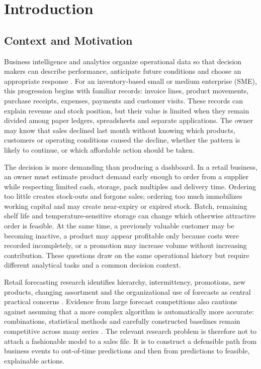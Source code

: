 \chapter{Introduction}
\label{chapter_introduction}

\section{Context and Motivation}

Business intelligence and analytics organize operational data so that decision
makers can describe performance, anticipate future conditions and choose an
appropriate response \cite{chen2012business}. For an inventory-based small or
medium enterprise (SME), this progression begins with familiar records: invoice
lines, product movements, purchase receipts, expenses, payments and customer
visits. These records can explain revenue and stock position, but their value is
limited when they remain divided among paper ledgers, spreadsheets and separate
applications. The owner may know that sales declined last month without knowing
which products, customers or operating conditions caused the decline, whether
the pattern is likely to continue, or which affordable action should be taken.

The decision is more demanding than producing a dashboard. In a retail
business, an owner must estimate product demand early enough to order from a
supplier while respecting limited cash, storage, pack multiples and delivery
time. Ordering too little creates stock-outs and forgone sales; ordering too
much immobilizes working capital and may create near-expiry or expired stock.
Batch, remaining shelf life and temperature-sensitive storage can change which
otherwise attractive order is feasible. At the same time, a previously valuable
customer may be becoming inactive, a product may appear profitable only because
costs were recorded incompletely, or a promotion may increase volume without
increasing contribution. These questions draw on the same operational history
but require different analytical tasks and a common decision context.

Retail forecasting research identifies hierarchy, intermittency, promotions,
new products, changing assortment and the organizational use of forecasts as
central practical concerns \cite{fildes2022retail}. Evidence from large forecast
competitions also cautions against assuming that a more complex algorithm is
automatically more accurate: combinations, statistical methods and carefully
constructed baselines remain competitive across many series
\cite{makridakis2022m5}. The relevant research problem is
therefore not to attach a fashionable model to a sales file. It is to construct
a defensible path from business events to out-of-time predictions and then from
predictions to feasible, explainable actions.

